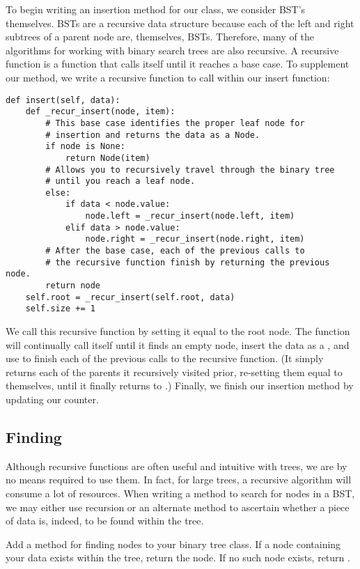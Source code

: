 To begin writing an insertion method for our  class, we consider BST's themselves.
BSTs are a recursive data structure because each of the left and right subtrees of a parent node are, themselves, BSTs.
Therefore, many of the algorithms for working with binary search trees are also recursive.
A recursive function is a function that calls itself until it reaches a base case.
To supplement our  method, we write a recursive function to call within our insert function:
\begin{lstlisting}
def insert(self, data):
    def _recur_insert(node, item):
        # This base case identifies the proper leaf node for
        # insertion and returns the data as a Node.
        if node is None:
            return Node(item)
        # Allows you to recursively travel through the binary tree
        # until you reach a leaf node.
        else:
            if data < node.value:
                node.left = _recur_insert(node.left, item)
            elif data > node.value:
                node.right = _recur_insert(node.right, item)
        # After the base case, each of the previous calls to
        # the recursive function finish by returning the previous node.
        return node
    self.root = _recur_insert(self.root, data)
    self.size += 1
\end{lstlisting}
We call this recursive function by setting it equal to the root node.
The function will continually call itself until it finds an empty node, insert the data as a , and use  to finish each of the previous calls to the recursive function. 
(It simply returns each of the parents it recursively visited prior, re-setting them equal to themselves, until it finally returns to .)
Finally, we finish our insertion method by updating our counter.

\subsection*{Finding}
Although recursive functions are often useful and intuitive with trees, we  are by no means required to use them.
In fact, for large trees, a recursive algorithm will consume a lot of resources.
When writing a method to search for nodes in a BST, we may either use recursion or an alternate method to ascertain whether a piece of data is, indeed, to be found within the tree.

\begin{problem}
Add a method for finding nodes to your binary tree class. If a node containing your data exists within the tree, return the node.
If no such node exists, return .
\label{Finding Nodes}
\end{problem}

